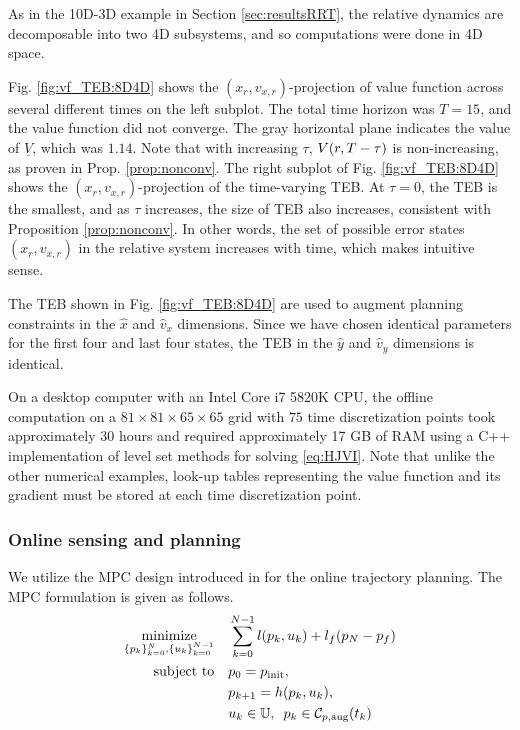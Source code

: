 As in the 10D-3D example in Section \ref{sec:resultsRRT}, the relative dynamics are decomposable into two 4D subsystems, and so computations were done in 4D space.

Fig. \ref{fig:vf_TEB:8D4D} shows the $(x_r, v_{x,r})$-projection of value function across several different times on the left subplot.
The total time horizon was $T=15$, and the value function did not converge.
The gray horizontal plane indicates the value of $\underline V$, which was $1.14$.
Note that with increasing $\tau$, $V(r,T-\tau)$ is non-increasing, as proven in Prop. \ref{prop:nonconv}.
The right subplot of Fig. \ref{fig:vf_TEB:8D4D} shows the $(x_r, v_{x,r})$-projection of the time-varying TEB.
At $\tau=0$, the TEB is the smallest, and as $\tau$ increases, the size of TEB also increases, consistent with Proposition \ref{prop:nonconv}.
In other words, the set of possible error states $(x_r, v_{x,r})$ in the relative system increases with time, which makes intuitive sense.

The TEB shown in Fig. \ref{fig:vf_TEB:8D4D} are used to augment planning constraints in the $\hat x$ and $\hat v_x$ dimensions.
Since we have chosen identical parameters for the first four and last four states, the TEB in the $\hat y$ and $\hat v_y$ dimensions is identical.

On a desktop computer with an Intel Core i7 5820K CPU, the offline computation on a $81\times81\times65\times65$ grid with $75$ time discretization points took approximately 30 hours and  required approximately 17 GB of RAM using a C++ implementation of level set methods for solving \eqref{eq:HJVI}.
Note that unlike the other numerical examples, look-up tables representing the value function and its gradient must be stored at each time discretization point.

\subsubsection{Online sensing and planning}
%
We utilize the MPC design introduced in \cite{Zhang2017} for the online trajectory planning. The MPC formulation is given as follows.
%
\begin{subequations} \label{eq:MPC}
  \begin{align}
  \underset{\{p_k\}_{k=0}^N, \{u_k\}_{k=0}^{N-1}}{\text{minimize}} \quad
  & \sum^{N-1}_{k=0} l(p_k,u_k) + l_f(p_N-p_f)  \\
  \text{subject to} \quad & p_0 = p_{\text{init}},\\
  &p_{k+1} = h(p_k,u_k),\\
  & u_k \in \mathbb{U},\enspace p_k \in \mathcal C_{p,\text{aug}}(t_k) 
  \end{align}
\end{subequations}

